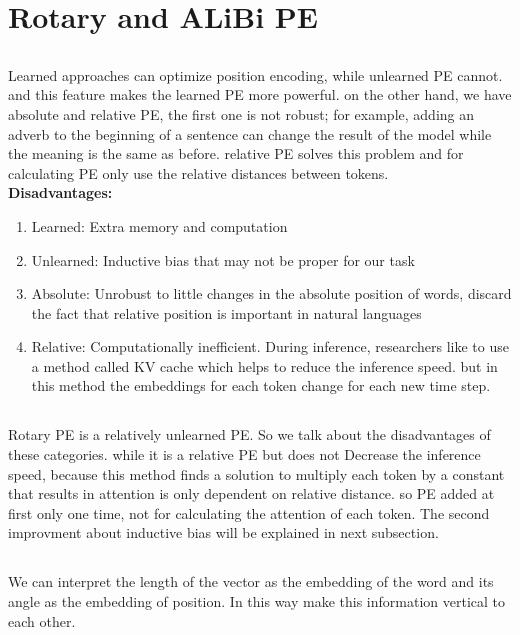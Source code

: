 \documentclass{article}
\begin{document}
\section{Rotary and ALiBi PE}
\subsection{}
Learned approaches can optimize position encoding, while unlearned PE cannot. 
and this feature makes the learned PE more powerful.
on the other hand, we have absolute 
and relative PE, the first one is not robust; for example, adding an adverb to the beginning 
of a sentence can change the result of the model while the meaning is the same as before. relative PE solves 
this problem and for calculating PE only use the relative distances between tokens.
\\

\textbf{Disadvantages:}
\begin{enumerate}
    \item 
    Learned: Extra memory and computation
    \item
    Unlearned: Inductive bias that may not be proper for our task
    \item 
    Absolute: Unrobust to little changes in the absolute position of words, discard the fact that relative position is important in natural languages
    \item 
    Relative: Computationally inefficient. During inference, researchers like to use a method called KV cache which helps to reduce the inference speed.
    but in this method the embeddings for each token change for each new time step.
\end{enumerate}


\subsection{}
Rotary PE is a relatively unlearned PE. So we talk about the disadvantages of these categories.
while it is a relative PE but does not Decrease the inference speed, because this method finds a solution
to multiply each token by a constant that results in attention is only dependent on relative distance.
so PE added at first only one time, not for calculating the attention of each token. The second improvment 
about inductive bias will be explained in next subsection.


\subsection{}
We can interpret the length of the vector as the embedding of the word and its angle as the embedding of position.
In this way make this information vertical to each other.
\end{document}
